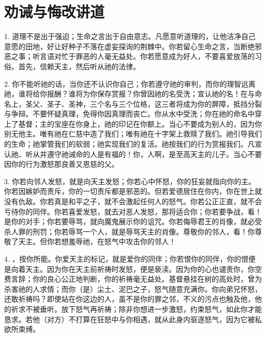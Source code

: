 
\chapter{劝诫与悔改讲道}


1. 道理不是出于强迫；生命之言出于自由意志。凡愿意听道理的，让他洁净自己意愿的田地，好让好种子不落在虚妄探询的荆棘中。你若留心生命之言，当断绝邪恶之事；听言语对忙于罪恶的人毫无益处。你若愿意成为好人，不要喜爱放荡的习俗。首先，信赖天主，然后听从祂的法律。\par

2. 你不能听祂的话，当你还不认识你自己；你若遵守祂的审判，而你的理智远离祂，谁将给你报酬？谁将为你保存赏报？你曾因祂的名受洗；宣认祂的名！在与命名上，圣父、圣子、圣神，三个名与三个位格，这三者将成为你的屏障，抵挡分裂与争辩。不要怀疑真理，免得你因真理而丧亡。你从水中受洗；你在祂的命名中穿上了基督；主的宝座在你身上，祂的印记在你额上。当心不要成为别人的，因为你别无他主。唯有祂在仁慈中造了我们；唯有祂在十字架上救赎了我们。祂引导我们的生命；祂掌管我们的软弱；祂实现我们的复活。祂按我们的行为赏报我们。凡宣认祂、听从并遵守祂诫命的人是有福的！你，人啊，是至高天主的儿子。当心不要因你的行为激怒那良善又恩慈的父。\par

3. 你若向邻人发怒，就是向天主发怒；你若心中怀怒，你的狂妄就指向你的主。你若因嫉妒而责斥，你的一切责斥都是邪恶的。但若爱德居住在你内，你在世上就没有仇敌。你若真是和平之子，就不会激起任何人的怒气。你若公正正直，就不会亏待你的同伴。你若喜爱发怒，就去对恶人发怒，那将适合你；你若要争战，看！是你的对手；你若要辱骂，就向魔鬼展示你的诅咒。你若侮辱君王的肖像，就必受杀人罪的刑罚；你若辱骂一个人，就是辱骂天主的肖像。尊敬你的邻人，看！你尊敬了天主。但你若想羞辱祂，在怒气中攻击你的邻人！\par

4. ，按你所能。你爱天主的标记，就是爱你的同伴；你若恨你的同伴，你的恨便是向着天主。因为你在天主前祈祷时发怒，便是亵渎。因为你的心也谴责你，你空费言辞；你的良心公正地判断，你的祈祷毫无益处。基督悬挂在树的高处时，曾为杀害祂的人求情；而你（是）尘土、泥巴之子，怒气随意充满你。你向弟兄怀怒，还敢祈祷吗？即使站在你这边的人，虽不是你的罪之邻，不义的污点也触及他，他的祈求不被垂听。放下怒气再祈祷；除非你想进一步激怒，约束怒气，如此你才能恳求。若他（对方）不打算在狂怒中与你相遇，就从此身内驱逐怒气，因为它被私欲所束缚。\par


